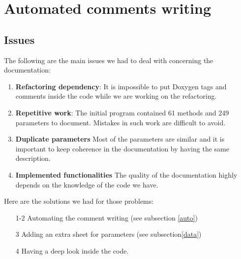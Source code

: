 \section{Automated comments writing}
\subsection{Issues}
The following are the main issues we had to deal with concerning the documentation:
\begin{enumerate}
\item \textbf{Refactoring dependency}: It is impossible to put Doxygen tags and comments inside the code while we are working on the refactoring.
\item \textbf{Repetitive work}: The initial program contained 61 methods and 249 parameters to document. Mistakes in such work are difficult to avoid.
\item \textbf{Duplicate parameters} Most of the parameters are similar and it is important to keep coherence in the documentation by having the same description.
\item \textbf{Implemented functionalities} The quality of the documentation highly depends on the knowledge of the code we have.
\end{enumerate}
Here are the solutions we had for those problems:
\begin{enumerate}
\item[1-2] Automating the comment writing (see subsection \ref{auto})
\item[3] Adding an extra sheet for parameters (see subsection\ref{data})
\item[4] Having a deep look inside the code.
\end{enumerate}
